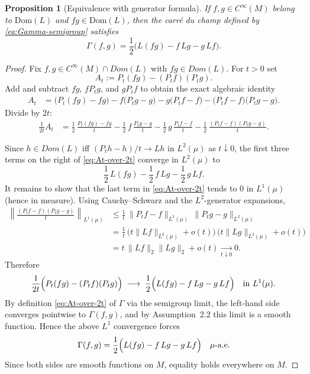 \documentclass[11pt]{amsart}
\newtheorem{proposition}[theorem]{Proposition}
\theoremstyle{definition}
\theoremstyle{remark}
\newcommand{\Dom}{Dom}
\begin{document}
\begin{proposition}[Equivalence with generator formula]
If $f,g\in C^\infty(M)$ belong to $\mathrm{Dom}(L)$ and $fg\in\mathrm{Dom}(L)$, then
the carré du champ defined by \eqref{eq:Gamma-semigroup} satisfies
\[
\Gamma(f,g)
=
\frac12\big(L(fg)-f\,Lg-g\,Lf\big).
\]    
\end{proposition} 
\begin{proof}
Fix $f,g\in C^\infty(M)\cap\Dom(L)$ with $fg\in\Dom(L)$. For $t>0$ set
\[
A_t := P_t(fg) - (P_tf)(P_tg).
\]
Add and subtract $fg$, $fP_tg$, and $gP_tf$ to obtain the exact algebraic identity
\begin{align}
A_t
&= \bigl(P_t(fg)-fg\bigr) - f\bigl(P_tg-g\bigr) - g\bigl(P_tf-f\bigr) - \bigl(P_tf-f\bigr)\bigl(P_tg-g\bigr).
\label{eq:At-decomp}
\end{align}
Divide by $2t$:
\begin{align}
\frac{1}{2t}A_t
&= \frac12\,\frac{P_t(fg)-fg}{t}
-\frac12\,f\,\frac{P_tg-g}{t}
-\frac12\,g\,\frac{P_tf-f}{t}
-\frac12\,\frac{(P_tf-f)(P_tg-g)}{t}.
\label{eq:At-over-2t}
\end{align}

Since $h\in\Dom(L)$ iff $(P_th-h)/t\to Lh$ in $L^2(\mu)$ as $t\downarrow0$, the first three terms on the right of \eqref{eq:At-over-2t} converge in $L^2(\mu)$ to
\[
\frac12\,L(fg) - \frac12\, f\,Lg - \frac12\, g\,Lf.
\]
It remains to show that the last term in \eqref{eq:At-over-2t} tends to $0$ in $L^1(\mu)$ (hence in measure). Using Cauchy--Schwarz and the $L^2$-generator expansions,
\begin{align*}
\left\|\frac{(P_tf-f)(P_tg-g)}{t}\right\|_{L^1(\mu)}
&\le \frac{1}{t}\,\|P_tf-f\|_{L^2(\mu)}\,\|P_tg-g\|_{L^2(\mu)} \\
&= \frac{1}{t}\,\bigl(t\|Lf\|_{L^2(\mu)}+o(t)\bigr)\,\bigl(t\|Lg\|_{L^2(\mu)}+o(t)\bigr) \\
&= t\,\|Lf\|_{2}\|Lg\|_{2} + o(t)\xrightarrow[t\downarrow0]{}0.
\end{align*}
Therefore
\[
\frac{1}{2t}\Bigl(P_t(fg)-(P_tf)(P_tg)\Bigr)
\;\longrightarrow\;
\frac12\Bigl(L(fg)-f\,Lg-g\,Lf\Bigr)
\quad\text{in }L^1(\mu).
\]
By definition \eqref{eq:At-over-2t} of $\Gamma$ via the semigroup limit, the left-hand side converges pointwise to $\Gamma(f,g)$, and by Assumption~2.2 this limit is a smooth function. Hence the above $L^1$ convergence forces
\[
\Gamma(f,g)=\frac12\Bigl(L(fg)-f\,Lg-g\,Lf\Bigr)
\quad\mu\text{-a.e.}
\]
Since both sides are smooth functions on $M$, equality holds everywhere on $M$.
\end{proof}
\end{document}
